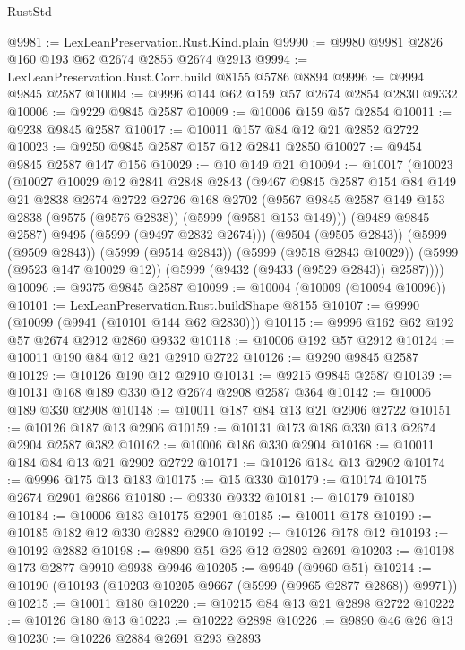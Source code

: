 \begin{lexlean}{RustStd}
\begin{coremodule}
@9981 := LexLeanPreservation.Rust.Kind.plain
@9990 := @9980 @9981 @2826 @160 @193 @62 @2674 @2855 @2674 @2913
@9994 := LexLeanPreservation.Rust.Corr.build @8155 @5786 @8894
@9996 := @9994 @9845 @2587
@10004 := @9996 @144 @62 @159 @57 @2674 @2854 @2830 @9332
@10006 := @9229 @9845 @2587
@10009 := @10006 @159 @57 @2854
@10011 := @9238 @9845 @2587
@10017 := @10011 @157 @84 @12 @21 @2852 @2722
@10023 := @9250 @9845 @2587 @157 @12 @2841 @2850
@10027 := @9454 @9845 @2587 @147 @156
@10029 := @10 @149 @21
@10094 := @10017
    (@10023
      (@10027
        @10029
        @12
        @2841
        @2848
        @2843
        (@9467
          @9845
          @2587
          @154
          @84
          @149
          @21
          @2838
          @2674
          @2722
          @2726
          @168
          @2702
          (@9567 @9845 @2587 @149 @153 @2838 (@9575 (@9576 @2838)) (@5999 (@9581 @153 @149)))
          (@9489 @9845 @2587)
          @9495
          (@5999 (@9497 @2832 @2674)))
        (@9504 (@9505 @2843))
        (@5999 (@9509 @2843))
        (@5999 (@9514 @2843))
        (@5999 (@9518 @2843 @10029))
        (@5999 (@9523 @147 @10029 @12))
        (@5999 (@9432 (@9433 (@9529 @2843)) @2587))))
@10096 := @9375 @9845 @2587
@10099 := @10004 (@10009 (@10094 @10096))
@10101 := LexLeanPreservation.Rust.buildShape @8155
@10107 := @9990 (@10099 (@9941 (@10101 @144 @62 @2830)))
@10115 := @9996 @162 @62 @192 @57 @2674 @2912 @2860 @9332
@10118 := @10006 @192 @57 @2912
@10124 := @10011 @190 @84 @12 @21 @2910 @2722
@10126 := @9290 @9845 @2587
@10129 := @10126 @190 @12 @2910
@10131 := @9215 @9845 @2587
@10139 := @10131 @168 @189 @330 @12 @2674 @2908 @2587 @364
@10142 := @10006 @189 @330 @2908
@10148 := @10011 @187 @84 @13 @21 @2906 @2722
@10151 := @10126 @187 @13 @2906
@10159 := @10131 @173 @186 @330 @13 @2674 @2904 @2587 @382
@10162 := @10006 @186 @330 @2904
@10168 := @10011 @184 @84 @13 @21 @2902 @2722
@10171 := @10126 @184 @13 @2902
@10174 := @9996 @175 @13 @183
@10175 := @15 @330
@10179 := @10174 @10175 @2674 @2901 @2866
@10180 := @9330 @9332
@10181 := @10179 @10180
@10184 := @10006 @183 @10175 @2901
@10185 := @10011 @178
@10190 := @10185 @182 @12 @330 @2882 @2900
@10192 := @10126 @178 @12
@10193 := @10192 @2882
@10198 := @9890 @51 @26 @12 @2802 @2691
@10203 := @10198 @173 @2877 @9910 @9938 @9946
@10205 := @9949 (@9960 @51)
@10214 := @10190 (@10193 (@10203 @10205 @9667 (@5999 (@9965 @2877 @2868)) @9971))
@10215 := @10011 @180
@10220 := @10215 @84 @13 @21 @2898 @2722
@10222 := @10126 @180 @13
@10223 := @10222 @2898
@10226 := @9890 @46 @26 @13
@10230 := @10226 @2884 @2691 @293 @2893

\end{coremodule}
\end{lexlean}
